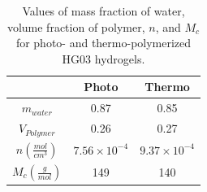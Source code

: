 \begin{table}[htbp]
\centering
\captionsetup{justification=centering}
\caption{Values of mass fraction of water, volume fraction of polymer, $n$, and $M_{c}$ for photo- and thermo-polymerized HG03 hydrogels.}\vspace{-0.25cm}
\begin{tabular}{c c c}
\hline
\hspace{-2mm}  & Photo & \hspace{-2mm} Thermo\\
\hline
\hspace{-2mm}$m_{water}$ & 0.87    & \hspace{-2mm}0.85\\
\hspace{-2mm}$V_{Polymer}$ & 0.26  & \hspace{-2mm}0.27\\
\hspace{-2mm}$n(\frac{mol}{cm^{3}})$ & $7.56 \times 10^{-4}$ & \hspace{-2mm}$9.37 \times 10^{-4}$\\
\hspace{-2mm}$M_{c}(\frac{g}{mol})$ & 149       & \hspace{-2mm}140\\
\hline
\end{tabular}
\label{table:flory}
\vspace{-4mm}
\end{table}

